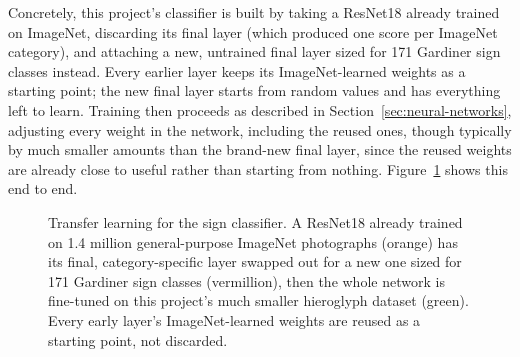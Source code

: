 \documentclass[11pt,a4paper]{report}
\begin{document}
Concretely, this project's classifier is built by taking a ResNet18 already
trained on ImageNet, discarding its final layer (which produced one score
per ImageNet category), and attaching a new, untrained final layer sized
for 171 Gardiner sign classes instead. Every earlier layer keeps its
ImageNet-learned weights as a starting point; the new final layer starts
from random values and has everything left to learn. Training then proceeds
as described in Section~\ref{sec:neural-networks}, adjusting every weight in
the network, including the reused ones, though typically by much smaller
amounts than the brand-new final layer, since the reused weights are
already close to useful rather than starting from nothing.
Figure~\ref{fig:transfer-learning} shows this end to end.

\begin{figure}[t]
\centering
{}
\caption{Transfer learning for the sign classifier. A ResNet18 already
trained on 1.4 million general-purpose ImageNet photographs (orange) has its
final, category-specific layer swapped out for a new one sized for 171
Gardiner sign classes (vermillion), then the whole network is fine-tuned on
this project's much smaller hieroglyph dataset (green). Every early layer's
ImageNet-learned weights are reused as a starting point, not discarded.}
\label{fig:transfer-learning}
\end{figure}
\end{document}

